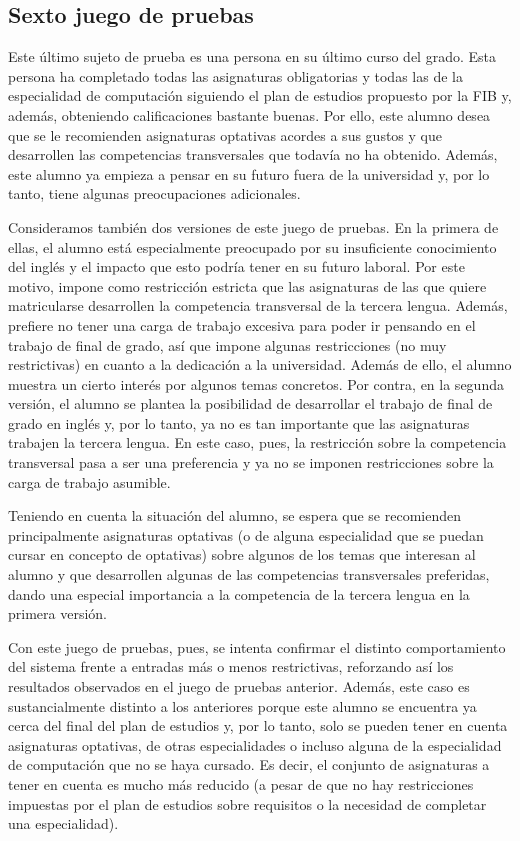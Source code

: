 
\subsection{Sexto juego de pruebas} \label{sec:prueba-6}

Este último sujeto de prueba es una persona en su último curso del grado. 
Esta persona ha completado todas las asignaturas obligatorias y todas las de 
la especialidad de computación siguiendo el plan de estudios propuesto por 
la FIB y, además, obteniendo calificaciones bastante buenas. Por ello, este 
alumno desea que se le recomienden asignaturas optativas acordes a sus gustos 
y que desarrollen las competencias transversales que todavía no ha obtenido. 
Además, este alumno ya empieza a pensar en su futuro fuera de la universidad 
y, por lo tanto, tiene algunas preocupaciones adicionales. 

Consideramos también dos versiones de este juego de pruebas. En la primera de 
ellas, el alumno está especialmente preocupado por su insuficiente 
conocimiento del inglés y el impacto que esto podría tener en su futuro 
laboral. Por este motivo, impone como restricción estricta que las asignaturas 
de las que quiere matricularse desarrollen la competencia transversal de la 
tercera lengua. Además, prefiere no tener una carga de trabajo excesiva para 
poder ir pensando en el trabajo de final de grado, así que impone algunas 
restricciones (no muy restrictivas) en cuanto a la dedicación a la 
universidad. Además de ello, el alumno muestra un cierto interés por algunos 
temas concretos. Por contra, en la segunda versión, el alumno se plantea la 
posibilidad de desarrollar el trabajo de final de grado en inglés y, por lo 
tanto, ya no es tan importante que las asignaturas trabajen la tercera lengua. 
En este caso, pues, la restricción sobre la competencia transversal pasa a 
ser una preferencia y ya no se imponen restricciones sobre la carga de trabajo
asumible.

Teniendo en cuenta la situación del alumno, se espera que se recomienden 
principalmente asignaturas optativas (o de alguna especialidad que se puedan 
cursar en concepto de optativas) sobre algunos de los temas que interesan al 
alumno y que desarrollen algunas de las competencias transversales preferidas, 
dando una especial importancia a la competencia de la tercera lengua en la 
primera versión.

Con este juego de pruebas, pues, se intenta confirmar el distinto 
comportamiento del sistema frente a entradas más o menos restrictivas, 
reforzando así los resultados observados en el juego de pruebas anterior. 
Además, este caso es sustancialmente distinto a los anteriores porque este 
alumno se encuentra ya cerca del final del plan de estudios y, por lo tanto, 
solo se pueden tener en cuenta asignaturas optativas, de otras especialidades 
o incluso alguna de la especialidad de computación que no se haya cursado. Es 
decir, el conjunto de asignaturas a tener en cuenta es mucho más reducido (a 
pesar de que no hay restricciones impuestas por el plan de estudios sobre 
requisitos o la necesidad de completar una especialidad).

